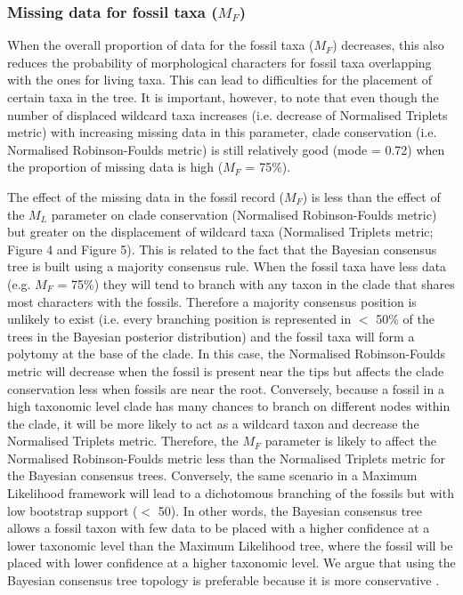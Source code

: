 \documentclass[12pt,letterpaper]{article}
\begin{document}
\subsubsection{Missing data for fossil taxa ($M_{F}$)}
When the overall proportion of data for the fossil taxa ($M_{F}$) decreases, this also reduces the probability of morphological characters for fossil taxa overlapping with the ones for living taxa.
This can lead to difficulties for the placement of certain taxa in the tree.
It is important, however, to note that even though the number of displaced wildcard taxa increases (i.e. decrease of Normalised Triplets metric) with increasing missing data in this parameter, clade conservation (i.e. Normalised Robinson-Foulds metric) is still relatively good (mode = 0.72) when the proportion of missing data is high ($M_{F}$ = 75\%).

The effect of the missing data in the fossil record ($M_{F}$) is less than the effect of the $M_{L}$ parameter on clade conservation (Normalised Robinson-Foulds metric) but greater on the displacement of wildcard taxa (Normalised Triplets metric; Figure 4 and Figure 5).
This is related to the fact that the Bayesian consensus tree is built using a majority consensus rule.
When the fossil taxa have less data (e.g. $M_{F}$ = 75\%) they will tend to branch with any taxon in the clade that shares most characters with the fossils.
Therefore a majority consensus position is unlikely to exist (i.e. every branching position is represented in $<$ 50\% of the trees in the Bayesian posterior distribution) and the fossil taxa will form a polytomy at the base of the clade.
In this case, the Normalised Robinson-Foulds metric will decrease when the fossil is present near the tips but affects the clade conservation less when fossils are near the root.
Conversely, because a fossil in a high taxonomic level clade has many chances to branch on different nodes within the clade, it will be more likely to act as a wildcard taxon and decrease the Normalised Triplets metric.
Therefore, the $M_{F}$ parameter is likely to affect the Normalised Robinson-Foulds metric less than the Normalised Triplets metric for the Bayesian consensus trees.
Conversely, the same scenario in a Maximum Likelihood framework will lead to a dichotomous branching of the fossils but with low bootstrap support ($<$ 50).
In other words, the Bayesian consensus tree allows a fossil taxon with few data to be placed with a higher confidence at a lower taxonomic level than the Maximum Likelihood tree, where the fossil will be placed with lower confidence at a higher taxonomic level.
We argue that using the Bayesian consensus tree topology is preferable because it is more conservative \citep[e.g.][]{pattinsonphylogeny2014}.
\end{document}
